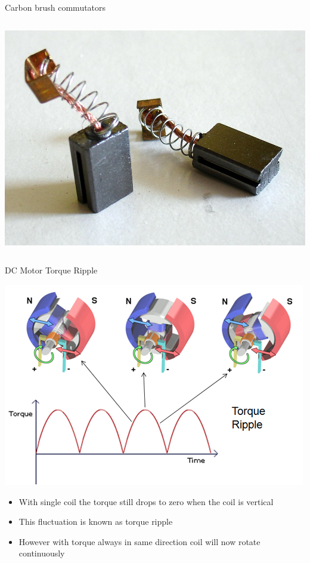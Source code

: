 \documentclass[compress]{beamer}
\begin{document}
\begin{frame}{Carbon brush commutators}
\begin{columns}
\begin{column}{0.4\linewidth}
\begin{center}
                \vspace{2em}
                \includegraphics[width=0.8\linewidth]{image23}
            \end{center}
        \end{column}
    \end{columns}


\end{frame}

\begin{frame}{DC Motor Torque Ripple}

    \begin{center}
        \includegraphics[height=0.35\paperheight]{image24}\hspace{1em}
    \end{center}

\begin{itemize}
\item With single coil the torque still drops to zero when the coil is
  vertical
\item This fluctuation is known as torque ripple
\item However with torque always in same direction coil will now rotate
  continuously
\end{itemize}

\end{frame}
\end{document}
